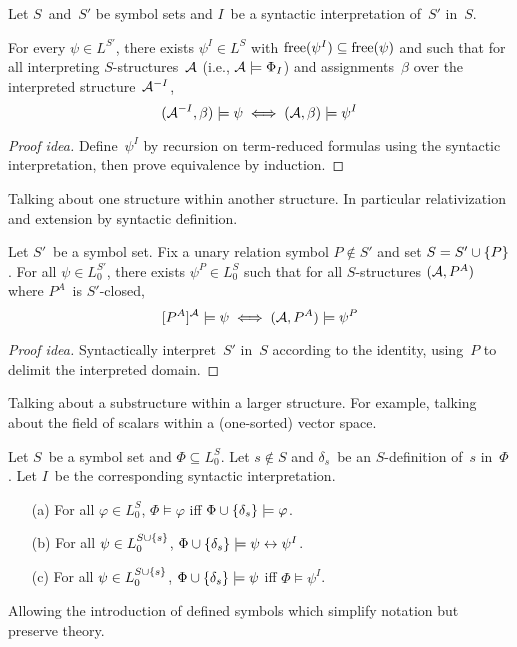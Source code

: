 \begin{thm}
Let \(S\)~and~\(S'\) be symbol sets and \(I\)~be a syntactic interpretation of~\(S'\) in~\(S\).

For every \(\psi\in L^{S'}\), there exists \(\psi^I\in L^S\) with \(\operatorname{free}(\psi^I)\subseteq\operatorname{free}(\psi)\) and such that for all interpreting \(S\)-structures~\(\mathcal{A}\) (i.e., \(\mathcal{A}\models\Phi_I\)) and assignments~\(\beta\) over the interpreted structure~\(\mathcal{A}^{-I}\),
\[(\mathcal{A}^{-I},\beta)\models\psi\iff(\mathcal{A},\beta)\models\psi^I\]
\end{thm}
\begin{proof}[Proof idea]
Define~\(\psi^I\) by recursion on term-reduced formulas using the syntactic interpretation, then prove equivalence by induction.
\end{proof}
\begin{app}
Talking about one structure within another structure. In particular relativization and extension by syntactic definition.
\end{app}

\begin{cor}[Relativization]
Let \(S'\)~be a symbol set. Fix a unary relation symbol \(P\not\in S'\) and set \(S=S'\cup\{P\}\). For all \(\psi\in L_0^{S'}\), there exists \(\psi^P\in L_0^S\) such that for all  \(S\)-structures \((\mathcal{A},P^A)\) where \(P^A\)~is \(S'\)-closed,
\[[P^A]^{\mathcal{A}}\models\psi\iff(\mathcal{A},P^A)\models\psi^P\]
\end{cor}
\begin{proof}[Proof idea]
Syntactically interpret~\(S'\) in~\(S\) according to the identity, using~\(P\) to delimit the interpreted domain.
\end{proof}
\begin{app}
Talking about a substructure  within a larger structure. For example, talking about the field of scalars within a (one-sorted) vector space.
\end{app}

\begin{cor}[Definitions]
Let \(S\)~be a symbol set and \(\Phi\subseteq L_0^S\). Let \(s\not\in S\) and \(\delta_s\)~be an \(S\)-definition of~\(s\) in~\(\Phi\). Let \(I\)~be the corresponding syntactic interpretation.
\begin{enumerate}[itemsep=0pt]
\item[(a)] For all \(\varphi\in L_0^S\), \(\Phi\models\varphi\) iff \(\Phi\cup\{\delta_s\}\models\varphi\).
\item[(b)] For all \(\psi\in L_0^{S\cup\{s\}}\), \(\Phi\cup\{\delta_s\}\models\psi\leftrightarrow\psi^I\).
\item[(c)] For all \(\psi\in L_0^{S\cup\{s\}}\), \(\Phi\cup\{\delta_s\}\models\psi\) iff \(\Phi\models\psi^I\).
\end{enumerate}
\end{cor}
\begin{app}
Allowing the introduction of defined symbols which simplify notation but preserve theory.
\end{app}

